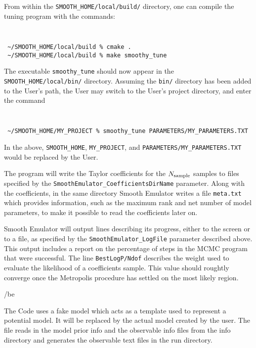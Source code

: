 \documentclass[main.tex]{subfiles}
\begin{document}
From within the {\tt SMOOTH\_HOME/local/build/} directory, one can compile the tuning program with the commands:
{\tt
\begin{verbatim}
 ~/SMOOTH_HOME/local/build % cmake .
 ~/SMOOTH_HOME/local/build % make smoothy_tune
\end{verbatim}
}
The executable {\tt smoothy\_tune} should now appear in the {\tt SMOOTH\_HOME/local/bin/} directory. Assuming the {\tt bin/} directory has been added to the User's path, the User may switch to the User's project directory, and enter the command
{\tt
\begin{verbatim}
 ~/SMOOTH_HOME/MY_PROJECT % smoothy_tune PARAMETERS/MY_PARAMETERS.TXT
\end{verbatim}
}
In the above, {\tt SMOOTH\_HOME}, {\tt MY\_PROJECT}, and {\tt PARAMETERS/MY\_PARAMETERS.TXT} would be replaced by the User.

The program will write the Taylor coefficients for the $N_{\rm sample}$ samples to files specified by the {\tt SmoothEmulator\_CoefficientsDirName} parameter.  Along with the coefficients, in the same directory Smooth Emulator writes a file {\tt meta.txt} which provides information, such as the maximum rank and net number of model parameters, to make it possible to read the coefficients later on.

Smooth Emulator will output lines describing its progress, either to the screen or to a file, as specified by the {\tt SmoothEmulator\_LogFile} parameter described above. This output includes a report on the percentage of steps in the MCMC program that were successful. The line {\tt BestLogP/Ndof} describes the weight used to evaluate the likelihood of a coefficients sample. This value should roughtly converge once the Metropolis procedure has settled on the most likely region. 

/be

The Code uses a fake model which acts as a template used to represent a potential model. It will be replaced by the actual model created by the user. The file reads in the model prior info and the observable info files from the info directory and generates the observable text files in the run directory. 
\end{document}
